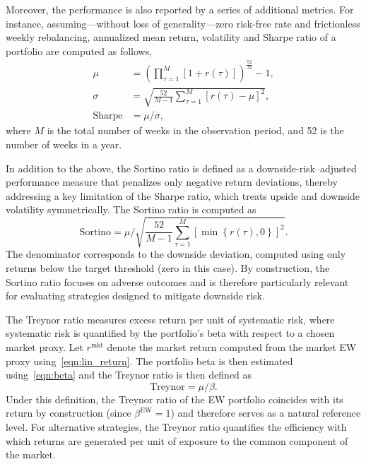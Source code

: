 \documentclass[pdflatex,sn-basic]{sn-jnl}%
\theoremstyle{thmstyleone}%
\theoremstyle{thmstyletwo}%
\theoremstyle{thmstylethree}%
\newcommand{\brc}[1]{\left( #1 \right)}
\newcommand{\sqbrc}[1]{\left[ #1 \right]}
\newcommand{\figbrc}[1]{\left\{ #1 \right\} }
\begin{document}
Moreover, the performance is also reported by a series of additional metrics. For instance, assuming---without loss of generality---zero risk-free rate and frictionless weekly rebalancing, annualized mean return, volatility and Sharpe ratio of a portfolio are computed as follows,
\begin{align}
    \mu &= \brc{ \prod_{\tau=1}^{M} \sqbrc{1 + r(\tau)} }^{\frac{52}{M}} - 1, \\
    \sigma &= \sqrt{\frac{52}{M-1} \sum_{\tau=1}^{M} \sqbrc{r(\tau) - \mu}^2}, \\
    \textrm{Sharpe} &= \mu / \sigma,
\end{align}
where $M$ is the total number of weeks in the observation period, and 52 is the number of weeks in a year.

In addition to the above, the Sortino ratio is defined as a downside-risk–adjusted performance measure that penalizes only negative return deviations, thereby addressing a key limitation of the Sharpe ratio, which treats upside and downside volatility symmetrically. The Sortino ratio is computed as
\begin{equation}
\mathrm{Sortino}
=
\mu / \sqrt{\frac{52}{M-1} \sum_{\tau=1}^{M} \sqbrc{\min\figbrc{r(\tau), 0}}^2}.
\end{equation}
The denominator corresponds to the downside deviation, computed using only returns below the target threshold (zero in this case). By construction, the Sortino ratio focuses on adverse outcomes and is therefore particularly relevant for evaluating strategies designed to mitigate downside risk.

The Treynor ratio measures excess return per unit of systematic risk, where systematic risk is quantified by the portfolio's beta with respect to a chosen market proxy. Let $r^{\textrm{mkt}}$ denote the market return computed from the market EW proxy using~\eqref{eqn:lin_return}. The portfolio beta is then estimated using~\eqref{eqn:beta} and the Treynor ratio is then defined as
\begin{equation}
\mathrm{Treynor}
=
\mu / \beta.
\end{equation}
Under this definition, the Treynor ratio of the EW portfolio coincides with its return by construction (since $\beta^{\textrm{EW}}=1$) and therefore serves as a natural reference level. For alternative strategies, the Treynor ratio quantifies the efficiency with which returns are generated per unit of exposure to the common component of the market.
\end{document}
